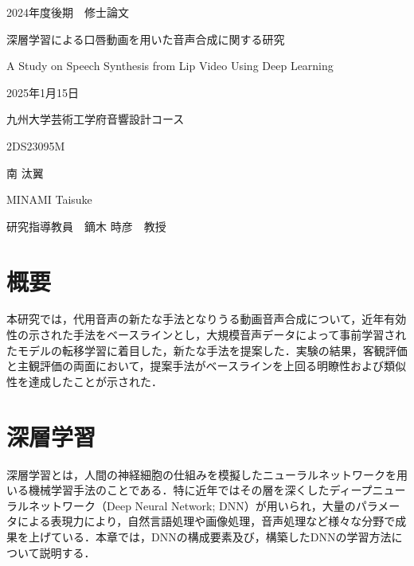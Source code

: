 \documentclass[12pt]{jarticle}
\numberwithin{equation}{section}    %
\numberwithin{figure}{section}      %
\numberwithin{table}{section}      %
\begin{document}
\begin{titlepage}
    \begin{center}
        {\Large 2024年度後期　修士論文}
        \vspace{120truept}

        {\huge 深層学習による口唇動画を用いた音声合成に関する研究}
        \vspace{30truept}

        {\huge A Study on Speech Synthesis from Lip Video Using Deep Learning}
        \vspace{120truept}

        {\Large 2025年1月15日}
        \vspace{10truept}

        {\Large 九州大学芸術工学府音響設計コース}
        \vspace{70truept}

        {\Large 2DS23095M}
        \vspace{10truept}

        {\Large 南 汰翼}
        \vspace{10truept}

        {\Large MINAMI Taisuke}
        \vspace{30truept}

        {\Large 研究指導教員　鏑木 時彦　教授}
    \end{center}
\end{titlepage}

\section*{概要}
\thispagestyle{empty}
本研究では，代用音声の新たな手法となりうる動画音声合成について，近年有効性の示された手法をベースラインとし，大規模音声データによって事前学習されたモデルの転移学習に着目した，新たな手法を提案した．実験の結果，客観評価と主観評価の両面において，提案手法がベースラインを上回る明瞭性および類似性を達成したことが示された．

\clearpage

\setcounter{tocdepth}{3}
\tableofcontents
\thispagestyle{empty}
\clearpage

\pagestyle{plain}
\setcounter{page}{1}


\clearpage


\clearpage

\section{深層学習}
深層学習とは，人間の神経細胞の仕組みを模擬したニューラルネットワークを用いる機械学習手法のことである．特に近年ではその層を深くしたディープニューラルネットワーク（Deep Neural Network; DNN）が用いられ，大量のパラメータによる表現力により，自然言語処理や画像処理，音声処理など様々な分野で成果を上げている．本章では，DNNの構成要素及び，構築したDNNの学習方法について説明する．


\end{document}
